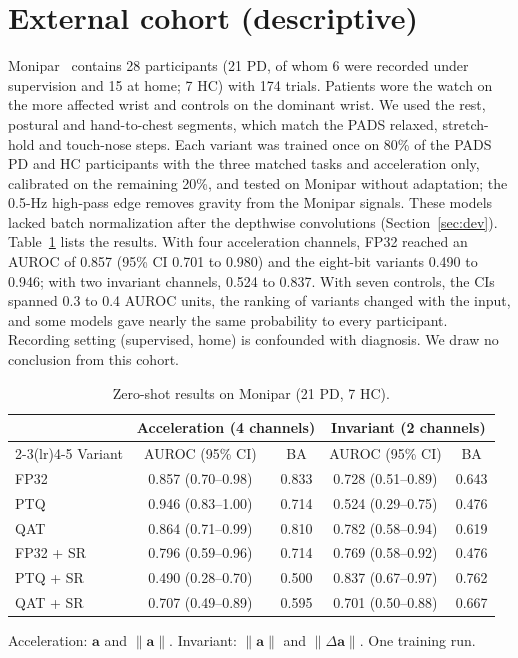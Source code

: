 \documentclass[preprint,12pt]{elsarticle}
\begin{document}
\section{External cohort (descriptive)}
Monipar~\cite{Monipar2023,MoniparData} contains 28 participants (21 PD, of whom 6 were recorded under supervision and 15 at home; 7 HC) with 174 trials. Patients wore the watch on the more affected wrist and controls on the dominant wrist. We used the rest, postural and hand-to-chest segments, which match the PADS relaxed, stretch-hold and touch-nose steps. Each variant was trained once on 80\% of the PADS PD and HC participants with the three matched tasks and acceleration only, calibrated on the remaining 20\%, and tested on Monipar without adaptation; the 0.5-Hz high-pass edge removes gravity from the Monipar signals. These models lacked batch normalization after the depthwise convolutions (Section~\ref{sec:dev}). Table~\ref{tab:monipar} lists the results. With four acceleration channels, FP32 reached an AUROC of 0.857 (95\% CI 0.701 to 0.980) and the eight-bit variants 0.490 to 0.946; with two invariant channels, 0.524 to 0.837. With seven controls, the CIs spanned 0.3 to 0.4 AUROC units, the ranking of variants changed with the input, and some models gave nearly the same probability to every participant. Recording setting (supervised, home) is confounded with diagnosis. We draw no conclusion from this cohort.

\begin{table}[!t]
\caption{Zero-shot results on Monipar (21 PD, 7 HC).}
\label{tab:monipar}
\centering\small
\begin{tabular}{@{}lcccc@{}}
\toprule
 & \multicolumn{2}{c}{Acceleration (4 channels)} & \multicolumn{2}{c}{Invariant (2 channels)} \\
\cmidrule(lr){2-3}\cmidrule(lr){4-5}
Variant & AUROC (95\% CI) & BA & AUROC (95\% CI) & BA \\
\midrule
FP32 & 0.857 (0.70--0.98) & 0.833 & 0.728 (0.51--0.89) & 0.643 \\
PTQ & 0.946 (0.83--1.00) & 0.714 & 0.524 (0.29--0.75) & 0.476 \\
QAT & 0.864 (0.71--0.99) & 0.810 & 0.782 (0.58--0.94) & 0.619 \\
FP32 + SR & 0.796 (0.59--0.96) & 0.714 & 0.769 (0.58--0.92) & 0.476 \\
PTQ + SR & 0.490 (0.28--0.70) & 0.500 & 0.837 (0.67--0.97) & 0.762 \\
QAT + SR & 0.707 (0.49--0.89) & 0.595 & 0.701 (0.50--0.88) & 0.667 \\
\bottomrule
\end{tabular}

\vspace{2pt}\parbox{\linewidth}{\footnotesize Acceleration: $\mathbf{a}$ and $\|\mathbf{a}\|$. Invariant: $\|\mathbf{a}\|$ and $\|\Delta\mathbf{a}\|$. One training run.}
\end{table}
\end{document}
